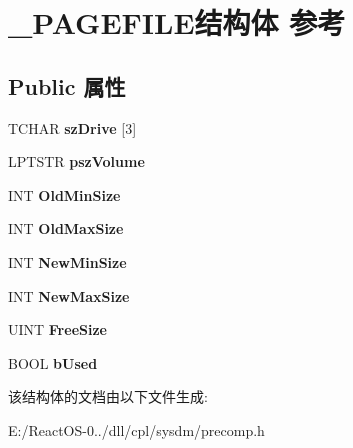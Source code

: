 \hypertarget{struct___p_a_g_e_f_i_l_e}{}\section{\+\_\+\+P\+A\+G\+E\+F\+I\+L\+E结构体 参考}
\label{struct___p_a_g_e_f_i_l_e}
\subsection*{Public 属性}
\begin{DoxyCompactItemize}
\item 
\mbox{\label{struct___p_a_g_e_f_i_l_e_a19d5fc4245253bb428d254b2f3e5bb88}} 
T\+C\+H\+AR {\bfseries sz\+Drive} \mbox{[}3\mbox{]}
\item 
\mbox{\label{struct___p_a_g_e_f_i_l_e_a2fd8073695e0f16b68d1cfa3d12058e6}} 
L\+P\+T\+S\+TR {\bfseries psz\+Volume}
\item 
\mbox{\label{struct___p_a_g_e_f_i_l_e_a93f26993d5acafa998d514ffe4db3d64}} 
I\+NT {\bfseries Old\+Min\+Size}
\item 
\mbox{\label{struct___p_a_g_e_f_i_l_e_af26af20431eadd24c43fc5cb579b05bb}} 
I\+NT {\bfseries Old\+Max\+Size}
\item 
\mbox{\label{struct___p_a_g_e_f_i_l_e_a61a02d197643dfa25afc693c393ab257}} 
I\+NT {\bfseries New\+Min\+Size}
\item 
\mbox{\label{struct___p_a_g_e_f_i_l_e_aff32d82c8521ec34ff130269160a6651}} 
I\+NT {\bfseries New\+Max\+Size}
\item 
\mbox{\label{struct___p_a_g_e_f_i_l_e_a5f9a9bcb72835e39ca09cfd593295853}} 
U\+I\+NT {\bfseries Free\+Size}
\item 
\mbox{\label{struct___p_a_g_e_f_i_l_e_a659e9b0dd5af325a37c71bd9d2d79bfd}} 
B\+O\+OL {\bfseries b\+Used}
\end{DoxyCompactItemize}


该结构体的文档由以下文件生成\+:\begin{DoxyCompactItemize}
\item 
E\+:/\+React\+O\+S-\/0../dll/cpl/sysdm/precomp.\+h\end{DoxyCompactItemize}
